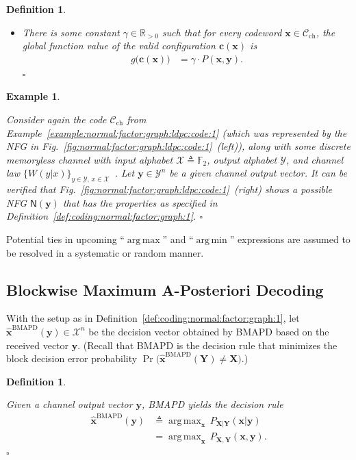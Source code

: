 \documentclass[journal, twocolumn]{IEEEtran}
\renewcommand{\mathbf}[1]{{\bm{#1}}}
\newcommand{\Rpp}{\mathbb{R}_{>0}}
\DeclareMathOperator*{\argmax}{arg\,max}
\newcommand{\vect}[1]{\mathbf{#1}}
\newcommand{\code}[1]{\mathcal{#1}}
\newcommand{\set}[1]{\mathcal{#1}}
\newcommand{\graph}[1]{\mathsf{#1}}
\DeclareMathOperator*{\argmin}{arg\,min}
\newcommand{\GF}[1]{\mathbb{F}_{#1}}
\newcommand{\defeq}{\triangleq}
\newcommand{\codeCchannel}{\code{C}_{\mathrm{ch}}}
\newcommand{\setX}{\set{X}}
\newcommand{\setY}{\set{Y}}
\newcommand{\vc}{\vect{c}}
\newcommand{\vX}{\vect{X}}
\newcommand{\vx}{\vect{x}}
\newcommand{\hvxBMAPD}{\vect{\hat x}^{\mathrm{BMAPD}}}
\newcommand{\vY}{\vect{Y}}
\newcommand{\vy}{\vect{y}}
\newcommand{\graphN}{\graph{N}}
\newcommand{\?}{\mathrm{?}}
\newcommand{\qedwhite}{\hspace*{\fill}%
  $\square$\smallskip}
\newcommand{\defend}{\qedwhite}
\newcommand{\exampleend}{\qedwhite}
\newtheorem{Definition}[Lemma]{Definition}
\newtheorem{Example}[Lemma]{Example}
\begin{document}
\begin{Definition}
\begin{itemize}
  \item There is some constant $\gamma \in \Rpp$ such that for every codeword
    $\vx \in \codeCchannel$, the global function value of the valid
    configuration $\vc(\vx)$ is
    \begin{align}
      g\big(
         \vc(\vx)
       \big)
        &= \gamma
           \cdot
           P(\vx, \vy).
             \label{eq:coding:global:function:1}
    \end{align}
  \defend
  
  \end{itemize}
\end{Definition}


\begin{Example}
  \label{example:normal:factor:graph:ldpc:code:2}

  Consider again the code $\codeCchannel$ from
  Example~\ref{example:normal:factor:graph:ldpc:code:1} (which was represented
  by the NFG in Fig.~\ref{fig:normal:factor:graph:ldpc:code:1}~(left)),
  along with some discrete memoryless channel with input alphabet $\setX
  \defeq \GF{2}$, output alphabet $\setY$, and channel law $\bigl\{ W(y|x)
  \bigr\}_{y \in \setY, \, x \in \setX}$~\!. Let $\vy \in \setY^n$ be a given
  channel output vector. It can be verified that
  Fig.~\ref{fig:normal:factor:graph:ldpc:code:1}~(right) shows a possible
  NFG $\graphN(\vy)$ that has the properties as specified in
  Definition~\ref{def:coding:normal:factor:graph:1}. \exampleend
\end{Example}


Potential ties in upcoming ``$\argmax$'' and ``$\argmin$'' expressions are
assumed to be resolved in a systematic or random manner.


\subsection{Blockwise Maximum A-Posteriori Decoding}
\label{sec:BMAPD:1}


With the setup as in Definition~\ref{def:coding:normal:factor:graph:1}, let
$\hvxBMAPD(\vy) \in \setX^n$ be the decision vector obtained by BMAPD based on
the received vector $\vy$. (Recall that BMAPD is the decision rule that
minimizes the block decision error probability $\operatorname{Pr}\bigl(
\hvxBMAPD(\vY) \neq \vX \bigr)$.)


\begin{Definition}
  \label{def:BMAPD:1}

  Given a channel output vector $\vy$, BMAPD yields the decision
  rule
  \begin{align}
    \hvxBMAPD(\vy)
      &\defeq
         \argmax_{\vx} \,
           P_{\vX|\vY}(\vx | \vy) \nonumber \\
      &= \argmax_{\vx} \,
           P_{\vX, \vY}(\vx, \vy).
             \label{eq:BMAPD:1}
  \end{align}
  \defend
\end{Definition}
\end{document}
